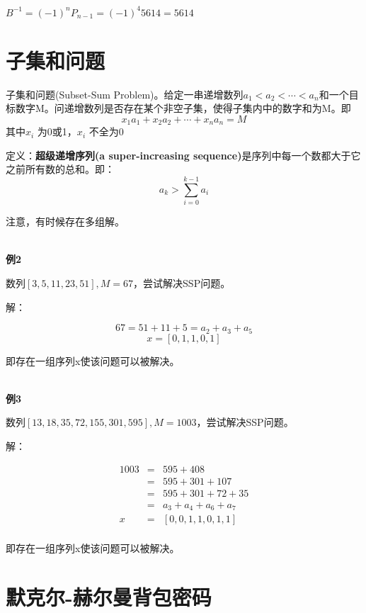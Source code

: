 \documentclass{article}
\begin{document}
$B^{-1} = (-1)^{n}P_{n-1}=(-1)^{4}5614 = 5614$ \quad\quad\quad\quad\quad\quad\quad\quad\quad\quad\quad\quad\quad\quad\quad\quad\quad\quad\quad\quad\quad   \Box

\section{子集和问题}
子集和问题(Subset-Sum Problem)。给定一串递增数列$a_{1}<a_{2}< \cdots < a_{n}$和一个目标数字M。问递增数列是否存在某个非空子集，使得子集内中的数字和为M。即
$$x_1a_1+x_2a_2+\cdots+x_na_n = M$$
其中$x_i$ 为0或1，$x_i$ 不全为0



定义：\textbf{超级递增序列(a super-increasing sequence)}是序列中每一个数都大于它之前所有数的总和。即：
$$
a_{k}>\sum_{i=0}^{k-1} a_{i}
$$

注意，有时候存在多组解。

~\\

\textbf{例2}

数列$[3,5,11,23,51],M=67$，尝试解决SSP问题。

解：

$$67=51+11+5=a_2+a_3+a_5$$
$$x=[0,1,1,0,1]$$

即存在一组序列x使该问题可以被解决。\quad\quad\quad\quad\quad\quad\quad\quad\quad\quad\quad\quad\quad\quad\quad\quad\quad\quad\quad\quad\quad   \Box

~\\

\textbf{例3}

数列$[13,18,35,72,155,301,595],M=1003$，尝试解决SSP问题。

解：

\begin{eqnarray}   
\label{eq}
1003&=&595 + 408 \nonumber \\ 
&=&  595+301+107\nonumber \\ 
&=& 595+301+72+35\nonumber \\ 
&=& a_3+a_4+a_6+a_7\nonumber \\ 
x&=&[0,0,1,1,0,1,1]\nonumber \\ 
\nonumber 
\end{eqnarray}

即存在一组序列x使该问题可以被解决。\quad\quad\quad\quad\quad\quad\quad\quad\quad\quad\quad\quad\quad\quad\quad\quad\quad\quad\quad\quad\quad   \Box

\clearpage

\section{默克尔-赫尔曼背包密码}
\end{document}
